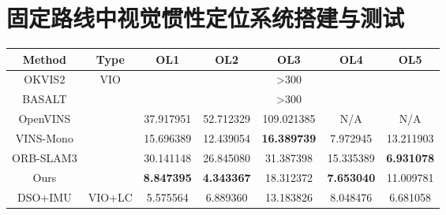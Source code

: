 
\chapter{固定路线中视觉惯性定位系统搭建与测试}


\begin{table}[]
  \centering
  \begin{tabular}{c|c|ccccc}
  \toprule
  \textbf{Method} & \textbf{Type}           & \textbf{OL1} & \textbf{OL2} & \textbf{OL3} & \textbf{OL4} & \textbf{OL5} \\ \midrule
  OKVIS2          & \multirow{6}{*}{VIO}    & \multicolumn{5}{c}{\textgreater{}300}                       \\
  BASALT          &                         & \multicolumn{5}{c}{\textgreater{}300}                       \\
  OpenVINS        &                         & 37.917951                                & 52.712329                                & 109.021385                               & N/A                                      & N/A                                      \\
  VINS-Mono       &                         & 15.696389                                & 12.439054                                & \cellcolor[HTML]{FA7F6F}\textbf{16.389739}                                & 7.972945                                 & 13.211903                                \\
  ORB-SLAM3       &                         & 30.141148                                & 26.845080                                & 31.387398                                & 15.335389                                & \cellcolor[HTML]{FA7F6F}\textbf{6.931078}                                 \\
  Ours            &                         & \cellcolor[HTML]{FA7F6F}\textbf{8.847395}                                 & \cellcolor[HTML]{FA7F6F}\textbf{4.343367}                                 & 18.312372                                & \cellcolor[HTML]{FA7F6F}\textbf{7.653040}                                 & 11.009781                                \\ \midrule
  DSO+IMU         & \multirow{7}{*}{VIO+LC} & 5.575564                                 & 6.889360                                 & 13.183826                                & 8.048476                                 & 6.681058                                 \\

\end{tabular}
\end{table}
